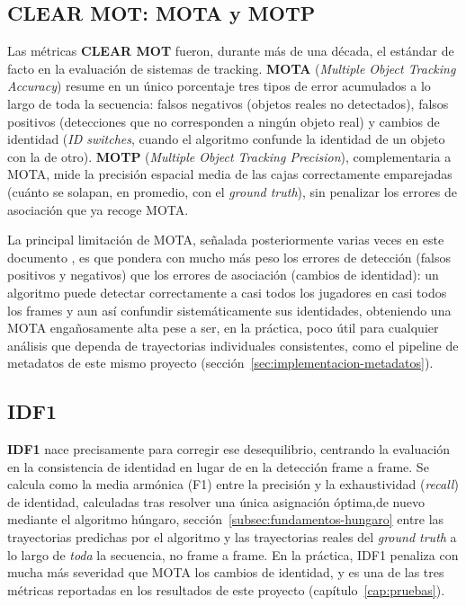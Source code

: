 \subsection{CLEAR MOT: MOTA y MOTP}

Las métricas \textbf{CLEAR MOT} \citep{bernardin2008clearmot} fueron,
durante más de una década, el estándar de facto en la evaluación de
sistemas de tracking. \textbf{MOTA} (\emph{Multiple Object Tracking
Accuracy}) resume en un único porcentaje tres tipos de error acumulados a
lo largo de toda la secuencia: falsos negativos (objetos reales no
detectados), falsos positivos (detecciones que no corresponden a ningún
objeto real) y cambios de identidad (\emph{ID switches}, cuando el
algoritmo confunde la identidad de un objeto con la de otro). \textbf{MOTP}
(\emph{Multiple Object Tracking Precision}), complementaria a MOTA, mide la
precisión espacial media de las cajas correctamente emparejadas (cuánto se
solapan, en promedio, con el \emph{ground truth}), sin penalizar los
errores de asociación que ya recoge MOTA.

La principal limitación de MOTA, señalada posteriormente varias veces
en este documento \citep{luiten2021hota}, es que pondera con mucho más peso los
errores de detección (falsos positivos y negativos) que los errores de
asociación (cambios de identidad): un algoritmo puede detectar
correctamente a casi todos los jugadores en casi todos los frames y aun así
confundir sistemáticamente sus identidades, obteniendo una MOTA
engañosamente alta pese a ser, en la práctica, poco útil para cualquier
análisis que dependa de trayectorias individuales consistentes, como el
pipeline de metadatos de este mismo proyecto
(sección~\ref{sec:implementacion-metadatos}).

\subsection{IDF1}

\textbf{IDF1} \citep{ristani2016idf1} nace precisamente para corregir ese
desequilibrio, centrando la evaluación en la consistencia de identidad en
lugar de en la detección frame a frame. Se calcula como la media armónica
(F1) entre la precisión y la exhaustividad (\emph{recall}) de identidad,
calculadas tras resolver una única asignación óptima,de nuevo mediante el
algoritmo húngaro, sección~\ref{subsec:fundamentos-hungaro} entre las
trayectorias predichas por el algoritmo y las trayectorias reales del
\emph{ground truth} a lo largo de \emph{toda} la secuencia, no frame a
frame. En la práctica, IDF1 penaliza con mucha más severidad que MOTA los
cambios de identidad, y es una de las tres métricas reportadas en los
resultados de este proyecto (capítulo~\ref{cap:pruebas}).

